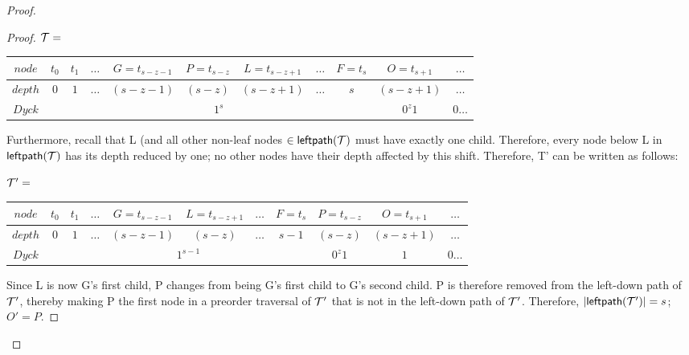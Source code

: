 \begin{proof}
\begin{proof}
    \bigskip
    \bigskip

	    $\mathcal{T}=$
    \begin{center}
	\begin{tabular}{ |c|c|c|c|c|c|c|c|c|c|c| } 
	    \hline

	    $node$ & $t_0$ & $t_1$ & $\dots$ & $G=t_{s-z-1}$ & $P=t_{s-z}$ & $L=t_{s-z+1}$ & $\dots$ & $F=t_s$ & $O=t_{s+1}$ & $\dots$ \\
	    \hline
	    $depth$ & $0$ & $1$ & $\dots$ & $(s-z-1)$ & $(s-z)$ & $(s-z+1)$ & $\dots$ & $s$  & $(s-z+1)$ & $\dots$\\
	    \hline
	    $Dyck$ &  &  \multicolumn{7}{|c|}{$1^s$} &  $0^{z}1$   & $0\dots$\\
	    \hline
	\end{tabular}
    \end{center}

    Furthermore, recall that L (and all other non-leaf nodes $\in \mathsf{leftpath}{(\mathcal{\mathcal{T}})}$ must have exactly one child.  Therefore, every node below L in $\mathsf{leftpath}{(\mathcal{\mathcal{T}})}$ has its depth reduced by one; no other nodes have their depth affected by this shift. Therefore, T' can be written as follows:

    \bigskip


	    $\mathcal{T}'=$
    \begin{center}
	\begin{tabular}{ |c|c|c|c|c|c|c|c|c|c|c| } 
	    \hline

	    $node$ & $t_0$ & $t_1$ & $\dots$ & $G=t_{s-z-1}$ & $L=t_{s-z+1}$ & $\dots$ & $F=t_s$ & $P=t_{s-z}$ & $O=t_{s+1}$ & $\dots$ \\
	    \hline
	    $depth$ & $0$ & $1$ & $\dots$ & $(s-z-1)$ & $(s-z)$ & $\dots$ & $s-1$ & $(s-z)$  & $(s-z+1)$ & $\dots$\\
	    \hline
	    $Dyck$ &  &  \multicolumn{6}{|c|}{$1^{s-1}$} &  $0^{z}1$   & $1$ & $0\dots$\\
	    \hline
	\end{tabular}
    \end{center}

    Since L is now G's first child, P changes from being G's first child to G's second child.  P is therefore removed from the left-down path of $\mathcal{T}'$, thereby making P the first node in a preorder traversal of $\mathcal{T}'$ that is not in the left-down path of $\mathcal{T}'$.  
    Therefore, $|\mathsf{leftpath}{(\mathcal{T'})}|=s$; $O'=P$. %


\end{proof}
\end{proof}
